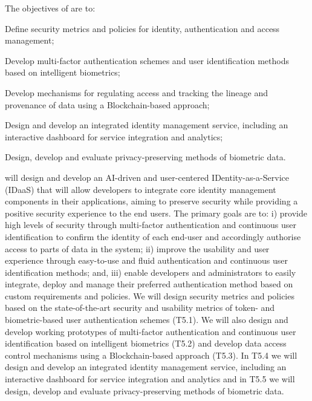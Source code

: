 \addtocounter{wpno}{1}
\begin{Workpackage}{\thewpno}
\WPTitle{\wpname{\thewpno}}

\begin{WPObjectives}
The objectives of \theWP{} are to:
\begin{compactitem}
\item Define security metrics and policies for identity, authentication and access management;
\item Develop multi-factor authentication schemes and %
user identification methods based on intelligent biometrics;
\item Develop mechanisms for regulating access and tracking the lineage and provenance of data using a Blockchain-based approach;
\item Design and develop an integrated identity management service, including an interactive dashboard for service integration and analytics;
\item Design, develop and evaluate privacy-preserving methods of biometric data.
\end{compactitem}
\end{WPObjectives}

\begin{WPDescription}
\theWP{} will design and develop an AI-driven and user-centered IDentity-as-a-Service (IDaaS) that will allow developers to integrate core identity management components in their applications, aiming to preserve security while providing a positive security experience to the end users. The primary goals are to: i) provide high levels of security through multi-factor authentication and continuous user identification to confirm the identity of each end-user and accordingly authorise access to parts of data in the system; ii) improve the usability and user experience through easy-to-use and fluid authentication and continuous user identification methods; and, iii) enable developers and administrators to easily integrate, deploy and manage their preferred authentication method based on custom requirements and policies. We will design security metrics and policies based on the state-of-the-art security and usability metrics of token- and biometric-based user authentication schemes (T5.1). We will also design and develop working prototypes of multi-factor authentication and continuous user identification based on intelligent biometrics (T5.2) and develop data access control mechanisms using a Blockchain-based approach (T5.3). In T5.4 we will design and develop an integrated identity management service, including an interactive dashboard for service integration and analytics and in T5.5 we will design, develop and evaluate privacy-preserving methods of biometric data.


\end{WPDescription}
\end{Workpackage}

